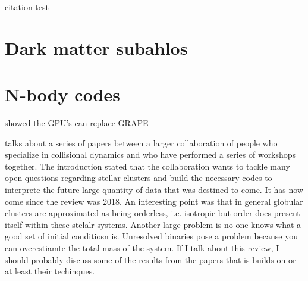 \textcite{DIO_OBSPM} citation test



\section{Dark matter subahlos}

\section{N-body codes}
\citep{2012MNRAS.424..545N} showed the GPU's can replace GRAPE


\citet{2018ComAC...5....2V} talks about a series of papers between a larger collaboration of people who specialize in collisional dynamics and who have performed a series of workshops together. The introduction stated that the collaboration wants to tackle many open questions regarding stellar clusters and build the necessary codes to interprete the future large quantity of data that was destined to come. It has now come since the review was 2018. An interesting point was that in general globular clusters are approximated as being orderless, i.e. isotropic but order does present itself within these stelalr systems. Another large problem is no one knows what a good set of initial conditiosn is. Unresolved binaries pose a problem because you can overestiamte the total mass of the system. If I talk about this review, I should probably discuss some of the results from the papers that is builds on or at least their techinques.

